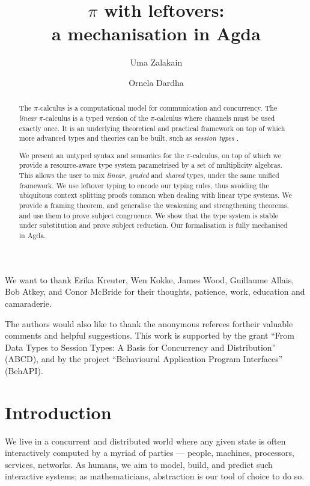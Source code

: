 \documentclass[sigplan,10pt,anonymous,review]{acmart}
\title[$\pi$ with leftovers: a mechanisation in Agda]{$\pi$ with leftovers: \\ a mechanisation in Agda}
\author{Uma Zalakain}
\affiliation{University of Glasgow, Scotland}
\author{Ornela Dardha}
\affiliation{University of Glasgow, Scotland}
\theoremstyle{definition}
\newcommand{\picalc}{$\pi$-calculus}
\begin{document}
\begin{acks}
We want to thank Erika Kreuter, Wen Kokke, James Wood, Guillaume Allais, Bob Atkey, and Conor McBride for their thoughts, patience, work, education and camaraderie.

The authors would also like to thank the anonymous referees fortheir valuable comments and helpful suggestions. This work is supported by the  grant  ``From Data Types to Session Types: A Basis for Concurrency and Distribution'' (ABCD), and by the  project  ``Behavioural Application Program Interfaces'' (BehAPI).
\end{acks}

\begin{abstract}
  The \picalc{} is a computational model for communication and concurrency.
  The \emph{linear} \picalc{} is a typed version of the \picalc{} where channels must be used exactly once.
  It is an underlying theoretical and practical framework on top of which more advanced types and theories can be built, such as \emph{session types} \cite{H93,THK94,HVK98}.

  We present an untyped syntax and semantics for the \picalc{}, on top of which we provide a resource-aware type system parametrised by a set of multiplicity algebras.
  This allows the user to mix \emph{linear}, \emph{graded} and \emph{shared} types, under the same unified framework.
  We use leftover typing \cite{Allais2018a} to encode our typing rules, thus avoiding the ubiquitous context splitting proofs common when dealing with linear type systems.
  We provide a framing theorem, and generalise the weakening and strengthening theorems, and use them to prove subject congruence.
  We show that the type system is stable under substitution and prove subject reduction.
%
  Our formalisation is fully mechanised in Agda.
\end{abstract}

\maketitle

\section{Introduction}

We live in a concurrent and distributed world where any given state is often interactively computed by a myriad of parties --- people, machines, processors, services, networks.
As humans, we aim to model, build, and predict such interactive systems; as mathematicians, abstraction is our tool of choice to do so.
\end{document}
